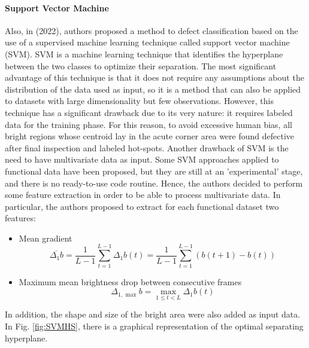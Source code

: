 \paragraph{Support Vector Machine} Also, in \citeauthor{bugatti_towards_2022} (2022),
authors proposed a method to defect classification based on the use of a supervised machine learning technique called support vector machine (SVM). SVM is a machine learning technique that identifies the hyperplane between the two classes to optimize their separation. The most significant advantage of this technique is that it does not require any assumptions about the distribution of the data used as input, so it is a method that can also be applied to datasets with large dimensionality but few observations. However, this technique has a significant drawback due to its very nature: it requires labeled data for the training phase. For this reason, to avoid excessive human bias, all bright regions whose centroid lay in the acute corner area were found defective after final inspection and labeled hot-spots. Another drawback of SVM is the need to have multivariate data as input. Some SVM approaches applied to functional data have been proposed, but they are still at an 'experimental' stage, and there is no ready-to-use code routine. Hence, the authors decided to perform some feature extraction in order to be able to process multivariate data. In particular, the authors proposed to extract for each functional dataset two features:
\begin{itemize}
    \item Mean gradient
    \begin{equation}
        \overline{\Delta_1 b}=\frac{1}{L-1} \sum_{t=1}^{L-1} \Delta_1 b(t)=\frac{1}{L-1} \sum_{t=1}^{L-1}(b(t+1)-b(t))
    \end{equation}
    \item Maximum mean brightness drop between consecutive frames
\begin{equation}
    \Delta_{1, \text { max }} b=\max _{1 \leq t<L} \Delta_1 b(t)
\end{equation}
\end{itemize}
In addition, the shape and size of the bright area were also added as input data. In Fig. \ref{fig:SVMHS}, there is a graphical representation of the optimal separating hyperplane.




